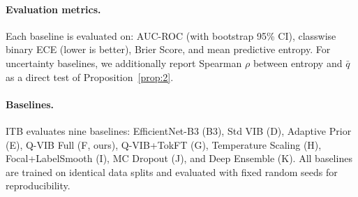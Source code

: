 \paragraph{Evaluation metrics.}
Each baseline is evaluated on: AUC-ROC (with bootstrap 95\% CI), classwise binary ECE (lower is better), Brier Score, and mean predictive entropy.
For uncertainty baselines, we additionally report Spearman $\rho$ between entropy and $\bar{q}$ as a direct test of Proposition~\ref{prop:2}.

\paragraph{Baselines.}
ITB evaluates nine baselines: EfficientNet-B3 (B3), Std VIB (D), Adaptive Prior (E), Q-VIB Full (F, ours), Q-VIB+TokFT (G), Temperature Scaling (H), Focal+LabelSmooth (I), MC Dropout (J), and Deep Ensemble (K).
All baselines are trained on identical data splits and evaluated with fixed random seeds for reproducibility.
